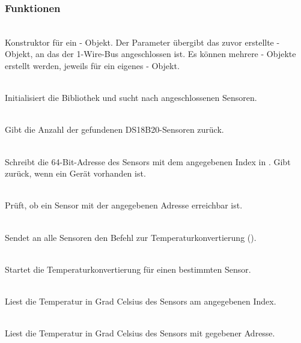 \subsubsection{Funktionen}
	\begin{description}
		\item {} \\ 
		Konstruktor für ein  - Objekt. Der Parameter  übergibt das zuvor erstellte  - Objekt, an das der 1-Wire-Bus angeschlossen ist. Es können mehrere  - Objekte erstellt werden, jeweils für ein eigenes  - Objekt.
		
		\item {} \\ 
		Initialisiert die Bibliothek und sucht nach angeschlossenen Sensoren.
		
		\item {} \\ 
		Gibt die Anzahl der gefundenen DS18B20-Sensoren zurück.
		
		\item {} \\ 
		Schreibt die 64-Bit-Adresse des Sensors mit dem angegebenen Index in . 
		Gibt  zurück, wenn ein Gerät vorhanden ist.
		
		\item {} \\ 
		Prüft, ob ein Sensor mit der angegebenen Adresse erreichbar ist.
		
		\item {} \\ 
		Sendet an alle Sensoren den Befehl zur Temperaturkonvertierung ().
		
		\item {} \\ 
		Startet die Temperaturkonvertierung für einen bestimmten Sensor.
		
		\item {} \\ 
		Liest die Temperatur in Grad Celsius des Sensors am angegebenen Index.
		
		\item {} \\ 
		Liest die Temperatur in Grad Celsius des Sensors mit gegebener Adresse.
		

\end{description}
